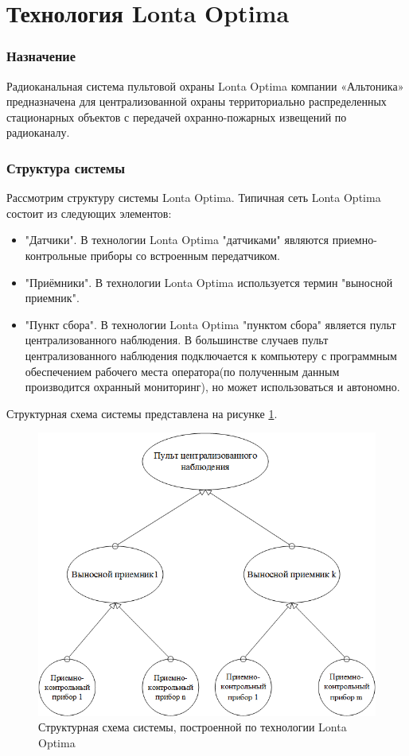 \section{Технология Lonta Optima}
\subsubsection{Назначение}
Радиоканальная система пультовой охраны Lonta Optima компании «Альтоника» предназначена для централизованной охраны территориально распределенных стационарных объектов с передачей охранно-пожарных извещений по радиоканалу.
\subsubsection{Структура системы}
Рассмотрим структуру системы Lonta Optima. Типичная сеть Lonta Optima состоит из следующих элементов: 
\begin{itemize}
	\item"Датчики". В технологии Lonta Optima "датчиками" являются приемно-контрольные приборы со встроенным передатчиком.  
	\item"Приёмники". В технологии  Lonta Optima используется термин "выносной приемник".
	\item"Пункт сбора". В технологии  Lonta Optima "пунктом сбора" является пульт централизованного наблюдения. В большинстве случаев пульт централизованного наблюдения подключается к компьютеру с программным обеспечением рабочего места оператора(по полученным данным производится охранный мониторинг), но может использоваться и автономно.  
\end{itemize}

Структурная схема системы представлена на рисунке
\ref{fig:Lonta_Optima}.

\begin{figure}[H]
	\centering\includegraphics[width=0.7\linewidth]{img/Lonta_Optima}
	\caption{Структурная схема системы, построенной по технологии Lonta Optima}
	\label{fig:Lonta_Optima}
\end{figure}

